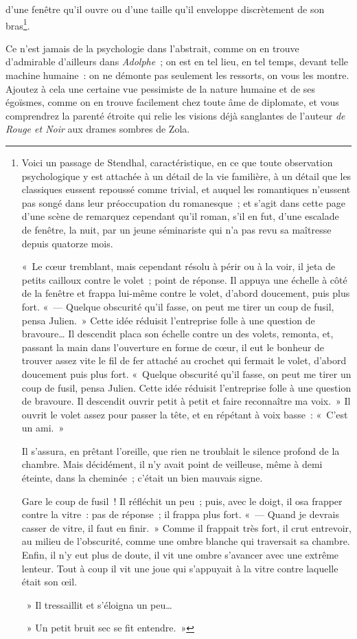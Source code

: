 \documentclass[french,twoside]{book} %
\begin{document}
d’une fenêtre qu’il ouvre ou d’une taille qu’il enveloppe discrètement de son bras\footnote{\noindent Voici un passage de Stendhal, caractéristique, en ce que toute observation psychologique y est attachée à un détail de la vie familière, à un détail que les classiques eussent repoussé comme trivial, et auquel les romantiques n’eussent pas songé dans leur préoccupation du romanesque ; et s’agit dans cette page d’une scène de remarquez cependant qu’il roman, s’il en fut, d’une escalade de fenêtre, la nuit, par un jeune séminariste qui n’a pas revu sa maîtresse depuis quatorze mois.\par
« Le cœur tremblant, mais cependant résolu à périr ou à la voir, il jeta de petits cailloux contre le volet ; point de réponse. Il appuya une échelle à côté de la fenêtre et frappa lui-même contre le volet, d’abord doucement, puis plus fort. « — Quelque obscurité qu’il fasse, on peut me tirer un coup de fusil, pensa Julien. » Cette idée réduisit l’entreprise folle à une question de bravoure… Il descendit placa son échelle contre un des volets, remonta, et, passant la main dans l’ouverture en forme de cœur, il eut le bonheur de trouver assez vite le fil de fer attaché au crochet qui fermait le volet, d’abord doucement puis plus fort. « Quelque obscurité qu’il fasse, on peut me tirer un coup de fusil, pensa Julien. Cette idée réduisit l’entreprise folle à une question de bravoure. Il descendit ouvrir petit à petit et faire reconnaître ma voix. » Il ouvrit le volet assez pour passer la tête, et en répétant à voix basse : « C’est un ami. »\par
Il s’assura, en prêtant l’oreille, que rien ne troublait le silence profond de la chambre. Mais décidément, il n’y avait point de veilleuse, même à demi éteinte, dans la cheminée ; c’était un bien mauvais signe.\par
Gare le coup de fusil ! Il réfléchit un peu ; puis, avec le doigt, il osa frapper contre la vitre : pas de réponse ; il frappa plus fort. « — Quand je devrais casser de vitre, il faut en finir. » Comme il frappait très fort, il crut entrevoir, au milieu de l’obscurité, comme une ombre blanche qui traversait sa chambre. Enfin, il n’y eut plus de doute, il vit une ombre s’avancer avec une extrême lenteur. Tout à coup il vit une joue qui s’appuyait à la vitre contre laquelle était son œil. \par
 » Il tressaillit et s’éloigna un peu… \par
 » Un petit bruit sec se fit entendre. »
}.\par
Ce n’est jamais de la psychologie dans l’abstrait, comme on en trouve d’admirable d’ailleurs dans \emph{Adolphe} ; on est en tel lieu, en tel temps, devant telle machine humaine : on ne démonte pas seulement les ressorts, on vous les montre. Ajoutez à cela une certaine vue pessimiste de la nature humaine et de ses égoïsmes, comme on en trouve facilement chez toute âme de diplomate, et vous comprendrez la parenté étroite qui relie les visions déjà sanglantes de l’auteur \emph{de Rouge et Noir} aux drames sombres de Zola.\par
\end{document}
